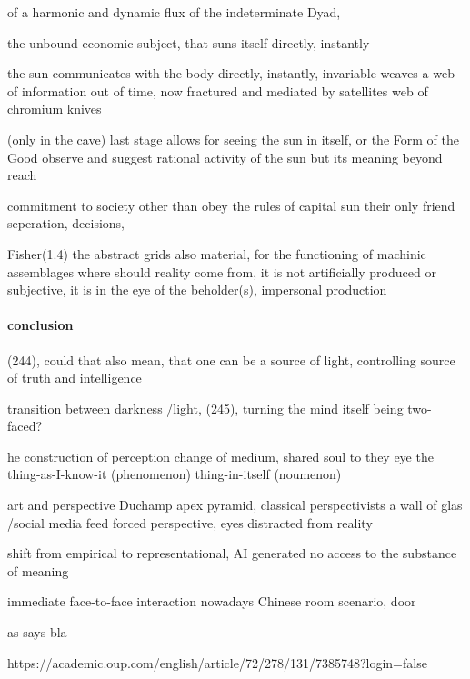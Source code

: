 \documentclass{article}
\begin{document}
of a harmonic and dynamic flux of the indeterminate Dyad, 




the unbound economic subject, that suns itself directly, instantly


the sun communicates with the body directly, instantly, invariable 
weaves a web of information out of time, 
now fractured and mediated by satellites
web of chromium knives



(only in the cave)
last stage allows for seeing the sun in itself, or the Form of the Good
observe and suggest rational activity of the sun
but its meaning beyond reach




commitment to society 
other than obey the rules of capital
sun their only friend
seperation, decisions, 





Fisher(1.4)
the abstract grids also material, for the functioning of machinic assemblages
where should reality come from, it is not artificially produced
or subjective, 
it is in the eye of the beholder(s), impersonal production


\paragraph{conclusion}


(244), could that also mean, 
that one can be a source of light, controlling source of truth and intelligence


transition between darkness /light, (245), turning the mind itself
being two-faced?



he construction of perception
change of medium, shared soul to they eye 
the thing-as-I-know-it (phenomenon) 
thing-in-itself (noumenon) 



art and perspective
Duchamp
apex pyramid, classical perspectivists
a wall of glas /social media feed
forced perspective, eyes distracted from reality


shift from empirical to representational, AI generated
no access to the substance of meaning
 
immediate face-to-face interaction
nowadays Chinese room scenario, door


as \textcite{tasic} says bla



https://academic.oup.com/english/article/72/278/131/7385748?login=false
\end{document}
